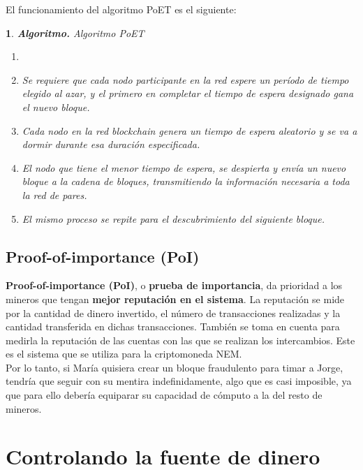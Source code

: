 \documentclass[10pt, a4paper]{article}
\theoremstyle{theorem-style}
\newtheorem*{datos}{}
\theoremstyle{theorem-style}
\theoremstyle{definition-style}
\theoremstyle{remark-style}
\theoremstyle{example-style}
\theoremstyle{definition-style}
\theoremstyle{remark-style}
\begin{document}
El funcionamiento del algoritmo PoET es el siguiente:

\begin{datos}
{\sffamily \textbf{Algoritmo.} Algoritmo PoET}\\
\begin{enumerate}
\def\labelenumi{\arabic{enumi}.}
\itemsep1pt\parskip0pt
\vspace{-1.2cm}
\item[]
	\hspace{1cm}
\item
  Se requiere que cada nodo participante en la red espere un período de tiempo elegido al azar, y el primero en completar el tiempo de espera designado gana el nuevo bloque.
\item
  Cada nodo en la red blockchain genera un tiempo de espera aleatorio y se va a dormir durante esa duración especificada.
\item
	El nodo que tiene el menor tiempo de espera, se despierta y envía un nuevo bloque a la cadena de bloques, transmitiendo la información necesaria a toda la red de pares.
\item
  El mismo proceso se repite para el descubrimiento del siguiente bloque.
\end{enumerate}
\end{datos}

\subsection{Proof-of-importance (PoI)}\label{proof-of-importance}

\textbf{Proof-of-importance (PoI)}, o \textbf{prueba de importancia}, da prioridad a los mineros que tengan \textbf{mejor reputación en el sistema}. La reputación se mide por la cantidad de dinero invertido, el número de transacciones realizadas y la cantidad transferida en dichas transacciones. También se toma en cuenta para medirla la reputación de las cuentas con las que se realizan los intercambios. Este es el sistema que se utiliza para la criptomoneda NEM.\\

Por lo tanto, si María quisiera crear un bloque fraudulento para timar a Jorge, tendría que seguir con su mentira indefinidamente, algo que es casi imposible, ya que para ello debería equiparar su capacidad de cómputo a la del resto de mineros.

\section{Controlando la fuente de
dinero}\label{controlando-la-fuente-de-dinero}
\end{document}
